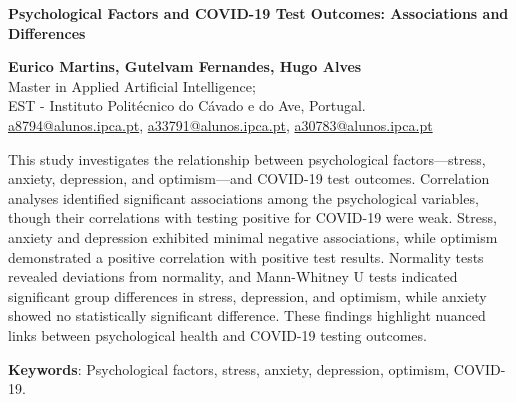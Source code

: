 \documentclass[a4paper]{article}
\begin{document}
\noindent
\textbf{Psychological Factors and COVID-19 Test Outcomes: Associations and Differences}\\
\vspace{0.1em} 
\noindent\hrulefill 
\vspace{0.8em} 

\begin{center}
    \textbf{Eurico Martins, Gutelvam Fernandes, Hugo Alves}\\
    \vspace{0.5em}
    Master in Applied Artificial Intelligence;\\
		EST - Instituto Politécnico do Cávado e do Ave, Portugal.\\
    \vspace{0.5em}
    \href{mailto:a8794@alunos.ipca.pt}{a8794@alunos.ipca.pt}, \href{mailto:a33791@alunos.ipca.pt}{a33791@alunos.ipca.pt}, \href{mailto:a30783@alunos.ipca.pt}{a30783@alunos.ipca.pt}
\end{center}

\vspace{3em}
\vspace{1em}\newline
This study investigates the relationship between psychological factors—stress, anxiety, depression, and optimism—and COVID-19 test outcomes.
Correlation analyses identified significant associations among the psychological variables, though their correlations with testing positive for COVID-19 were weak.
Stress, anxiety and depression exhibited minimal negative associations, while optimism demonstrated a positive correlation with positive test results.
Normality tests revealed deviations from normality, and Mann-Whitney U tests indicated significant group differences in stress, depression, and optimism,
while anxiety showed no statistically significant difference. These findings highlight nuanced links between psychological health and COVID-19 testing outcomes.

\vspace{1em}
\textbf{Keywords}: Psychological factors, stress, anxiety, depression, optimism, COVID-19.

\vspace{2em}
\end{document}
